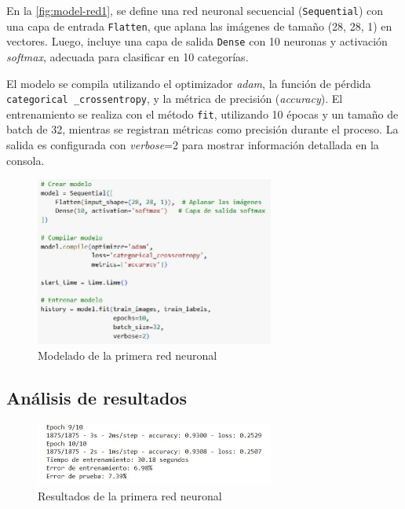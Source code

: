 En la \autoref{fig:model-red1}, se define una red neuronal secuencial (\texttt{Sequential}) con una capa de entrada \texttt{Flatten}, que aplana las imágenes de tamaño (28, 28, 1) en vectores. Luego, incluye una capa de salida \texttt{Dense} con 10 neuronas y activación \textit{softmax}, adecuada para clasificar en 10 categorías.

El modelo se compila utilizando el optimizador \textit{adam}, la función de pérdida \texttt{categorical \_crossentropy}, y la métrica de precisión (\textit{accuracy}). El entrenamiento se realiza con el método \texttt{fit}, utilizando 10 épocas y un tamaño de batch de 32, mientras se registran métricas como precisión durante el proceso. La salida es configurada con \textit{verbose}=2 para mostrar información detallada en la consola.

\begin{figure}[H]
	\centering
	\includegraphics[width=0.7\textwidth]{imgs/model-red1.JPG}
	\caption{Modelado de la primera red neuronal}
	\label{fig:model-red1}
\end{figure}

\subsection{Análisis de resultados}

\begin{figure}[H]
	\centering
	\includegraphics[width=0.7\textwidth]{imgs/results-red1.JPG}
	\caption{Resultados de la primera red neuronal}
	\label{fig:results-red1}
\end{figure}

